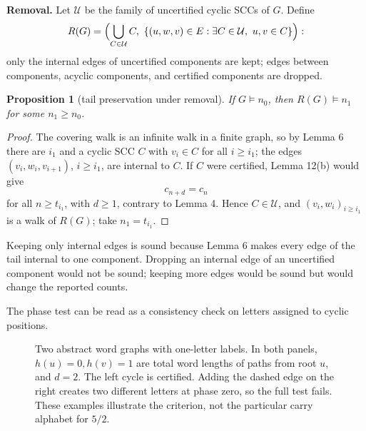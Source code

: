 \documentclass[11pt,reqno]{amsart}
\newtheorem{proposition}[theorem]{Proposition}
\theoremstyle{definition}
\theoremstyle{remark}
\begin{document}
\textbf{Removal.} Let \(\mathcal U\) be the family of uncertified cyclic SCCs
of \(G\). Define
\[
R(G)=\Bigl(\bigcup_{C\in\mathcal U}C,\
\{(u,w,v)\in E:\exists C\in\mathcal U,\ u,v\in C\}\Bigr):
\]
only the internal edges of uncertified components are kept; edges between
components, acyclic components, and certified components are dropped.

\begin{samepage}
\begin{proposition}[tail preservation under removal]\leavevmode\label{thm:13}
If
\(G\models n_0\), then \(R(G)\models n_1\) for some \(n_1\ge n_0\).
\label{thm-end:13}
\end{proposition}
\end{samepage}

\begin{proof}\leavevmode\label{proof:13}
The covering walk is an infinite walk in a finite graph, so by
Lemma 6 there are \(i_1\) and a cyclic SCC \(C\) with \(v_i\in C\) for
all \(i\ge i_1\); the edges \((v_i,w_i,v_{i+1})\), \(i\ge i_1\), are
internal to \(C\). If \(C\) were certified, Lemma 12(b) would give
\[
c_{n+d}=c_n
\]
for all \(n\ge t_{i_1}\), with \(d\ge1\), contrary to
Lemma 4. Hence \(C\in\mathcal U\), and \((v_i,w_i)_{i\ge i_1}\) is a
walk of \(R(G)\); take \(n_1=t_{i_1}\). \qedhere
\end{proof}

Keeping only internal edges is sound because Lemma 6 makes every edge of
the tail internal to one component. Dropping an internal edge of an
uncertified component would not be sound; keeping more edges would be
sound but would change the reported counts.

The phase test can be read as a consistency check on letters assigned to cyclic positions.

\begin{figure}[htbp]
\centering

\caption{Two abstract word graphs with one-letter labels. In both panels, \(h(u)=0,h(v)=1\) are total word lengths of paths from root \(u\), and \(d=2\). The left cycle is certified. Adding the dashed edge on the right creates two different letters at phase zero, so the full test fails. These examples illustrate the criterion, not the particular carry alphabet for \(5/2\).}
\label{fig:phase-test}
\end{figure}
\end{document}
